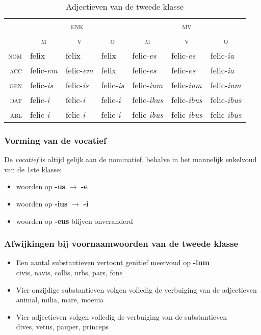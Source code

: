 \documentclass[12pt,a4paper]{article}
\begin{document}
\begin{table}[H]
\centering
\begin{tabular}{ r | l l l | l l l }
\toprule
 & \multicolumn{3}{c|}{\textsc{enk}} & \multicolumn{3}{c}{\textsc{mv}} \\
 & \multicolumn{1}{c}{\textsc{m}} & \multicolumn{1}{c}{\textsc{v}} & \multicolumn{1}{c|}{\textsc{o}} & \multicolumn{1}{c}{\textsc{m}} & \multicolumn{1}{c}{\textsc{v}} & \multicolumn{1}{c}{\textsc{o}} \\ 
\midrule
\textsc{nom} & felix           & felix           & felix           & felic-\emph{es}   & felic-\emph{es}   & felic-\emph{ia} \\
\textsc{acc} & felic-\emph{em} & felic-\emph{em} & felix           & felic-\emph{es}   & felic-\emph{es}   & felic-\emph{ia} \\
\textsc{gen} & felic-\emph{is} & felic-\emph{is} & felic-\emph{is} & felic-\emph{ium}  & felic-\emph{ium}  & felic-\emph{ium} \\
\textsc{dat} & felic-\emph{i}  & felic-\emph{i}  & felic-\emph{i}  & felic-\emph{ibus} & felic-\emph{ibus} & felic-\emph{ibus} \\
\textsc{abl} & felic-\emph{i}  & felic-\emph{i}  & felic-\emph{i}  & felic-\emph{ibus} & felic-\emph{ibus} & felic-\emph{ibus} \\
\bottomrule
\end{tabular}
\caption{Adjectieven van de tweede klasse}
\label{tab:adj2}
\end{table}

\subsubsection{Vorming van de vocatief}
De \emph{vocatief} is altijd gelijk aan de nominatief, behalve in het mannelijk enkelvoud van de 1ste klasse:
\begin{itemize}
    \item woorden op \textbf{-us}  $\rightarrow$ \textbf{-e}
    \item woorden op \textbf{-ius} $\rightarrow$ \textbf{-i}
    \item woorden op \textbf{-eus} blijven onveranderd
\end{itemize}

\subsubsection{Afwijkingen bij voornaamwoorden van de tweede klasse}
\begin{itemize}
    \item Een aantal substantieven vertoont genitief meervoud op \textbf{-ium} \\
        civis, navis, collis, urbs, pars, fons
    \item Vier onzijdige substantieven volgen volledig de verbuiging van de adjectieven \\
        animal, milia, mare, moenia
    \item Vier adjectieven volgen volledig de verbuiging van de substantieven \\
        dives, vetus, pauper, princeps
\end{itemize}
\end{document}
